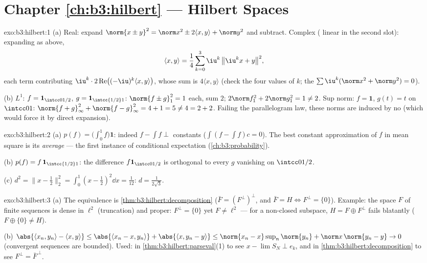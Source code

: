 \section*{Chapter \ref{ch:b3:hilbert} --- Hilbert Spaces}

\begin{solution}{exo:b3:hilbert:1}
(a) Real: expand $\norm{x \pm y}^2 = \norm x^2 \pm 2\langle
x,y\rangle + \norm y^2$ and subtract. Complex (
linear in the second slot): expanding as above,
\[
\langle x, y\rangle = \frac14\sum_{k=0}^{3}
\iu^k\,\bigl\|\iu^kx + y\bigr\|^2,
\]
each term contributing $\iu^k\cdot2\operatorname{Re}\bigl(
(-\iu)^k\langle x,y\rangle\bigr)$, whose sum is $4\langle
x,y\rangle$ (check the four values of $k$; the $\sum\iu^k
(\norm x^2 + \norm y^2) = 0$).

(b) $L^1$: $f = \mathbf 1_{\intcc0{1/2}}$, $g = \mathbf
1_{\intcc{1/2}1}$: $\norm{f\pm g}_1^2 = 1$ each, sum $2$;
$2\norm f_1^2 + 2\norm g_1^2 = 1 \neq 2$. Sup norm: $f =
\mathbf 1$, $g(t) = t$ on $\intcc01$: $\norm{f + g}_\infty^2 +
\norm{f-g}_\infty^2 = 4 + 1 = 5 \neq 4 = 2 + 2$. Failing the
parallelogram law, these norms are induced by no 
(which would force it by direct expansion).
\end{solution}

\begin{solution}{exo:b3:hilbert:2}
(a) $p(f) = \bigl(\int_0^1f\bigr)\mathbf 1$: indeed $f - \int f
\perp$ constants ($\int(f - \int f)c = 0$). The best constant
approximation of $f$ in mean square is its \emph{average} ---
the first instance of conditional expectation
(\cref{ch:b3:probability}).

(b) $p(f) = f\,\mathbf 1_{\intcc{1/2}1}$: the difference
$f\mathbf 1_{\intcc0{1/2}}$ is orthogonal to every $g$
vanishing on $\intcc0{1/2}$.

(c) $d^2 = \bigl\|x - \tfrac12\bigr\|_2^2 = \int_0^1(x -
\tfrac12)^2\dd x = \tfrac1{12}$: $d = \frac1{2\sqrt3}$.
\end{solution}

\begin{solution}{exo:b3:hilbert:3}
(a) The equivalence is \cref{thm:b3:hilbert:decomposition}
($\bar F = (F^\perp)^\perp$, and $\bar F = H \iff F^\perp =
\{0\}$). Example: the space $F$ of finite sequences is dense
in $\ell^2$ (truncation) and proper: $F^\perp = \{0\}$ yet $F
\neq \ell^2$ --- for a non-closed subspace, $H = F \oplus
F^\perp$ fails blatantly ($F \oplus \{0\} \neq H$).

(b) $\abs{\langle x_n, y_n\rangle - \langle x, y\rangle} \leq
\abs{\langle x_n - x, y_n\rangle} + \abs{\langle x, y_n -
y\rangle} \leq \norm{x_n - x}\sup_n\norm{y_n} + \norm
x\,\norm{y_n - y} \to 0$ (convergent sequences are bounded).
Used: in \cref{thm:b3:hilbert:parseval}(1) to see $x - \lim
S_N \perp e_k$, and in \cref{thm:b3:hilbert:decomposition}
to see $F^\perp = \bar F^{\,\perp}$.
\end{solution}


